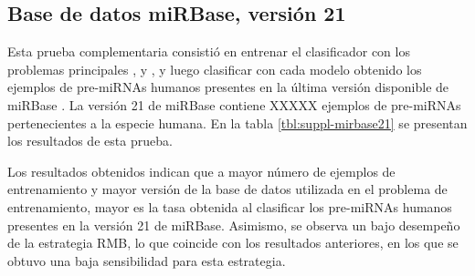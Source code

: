 
\subsection{Base de datos miRBase, versión 21}
Esta prueba complementaria consistió en entrenar el clasificador con
los problemas principales \tripletsvm{}, \mipred{} y \micropred{}, y
luego clasificar con cada modelo obtenido los ejemplos de pre-miRNAs
humanos presentes en la última versión disponible de miRBase
\cite{mirbase3}. La versión 21 de miRBase contiene XXXXX ejemplos de
pre-miRNAs pertenecientes a la especie humana.  En la tabla
\autoref{tbl:suppl-mirbase21} se presentan los resultados de esta
prueba.

Los resultados obtenidos indican que a mayor número de ejemplos de
entrenamiento y mayor versión de la base de datos utilizada en el
problema de entrenamiento, mayor es la tasa obtenida al clasificar los
pre-miRNAs humanos presentes en la versión 21 de miRBase.  Asimismo,
se observa un bajo desempeño de la estrategia RMB, lo que coincide con
los resultados anteriores, en los que se obtuvo una baja sensibilidad
para esta estrategia.


